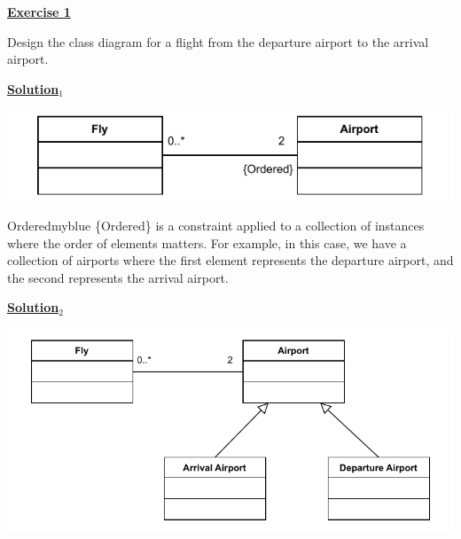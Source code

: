 \begin{center}
    \Huge{\textbf{\underline{Exercise 1}}}
\end{center}

\vspace{0.5cm}

Design the class diagram for a flight from the departure airport to the arrival airport.

\vspace{1cm}

\Large{\textbf{\underline{Solution\(_1\)}}}

\begin{center}
    \includegraphics[height=0.14\textheight]{Exercices/EX1/ex1.1.drawio.pdf}
\end{center}

\vspace{0.5cm}

\begin{prettyBox}{Ordered}{myblue}
\{Ordered\} is a constraint applied to a collection of instances where the order of elements
matters.  
For example, in this case, we have a collection of airports where the first element represents
the departure airport, and the second represents the arrival airport.  
\end{prettyBox}

\vspace{1cm}
\Large{\textbf{\underline{Solution\(_2\)}}}

\begin{center}
    \includegraphics[height=0.35\textheight]{Exercices/EX1/ex1.2.drawio.pdf}
\end{center}

